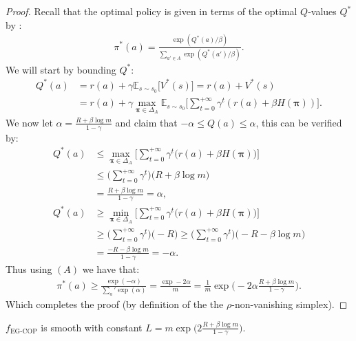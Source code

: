 \begin{proof}
    Recall that the optimal policy is given in terms of the optimal $Q$-values $Q^*$ by : 
    \begin{align*}
        \pi^*(a) = \frac{\exp(Q^*(a)/\beta)}{\sum_{a'\in A}\exp(Q^*(a')/\beta)}. \tag{A}
    \end{align*}
    We will start by bounding $Q^*$:
    \begin{align*}
        Q^*(a) &= r(a) + \gamma \mathbb{E}_{s \sim s_0} \Big[ V^*(s) \Big] = r(a) + V^*(s) \\
        & = r(a) + \gamma  \max_{\bm{\pi}\in \Delta_A} \mathbb{E}_{s \sim s_0} \Big[ \sum_{t=0}^{+\infty} \gamma^t (r(a)+\beta H(\bm{\pi})) \Big].
    \end{align*}
    We now let $\alpha = \frac{R + \beta \log m}{1-\gamma}$ and claim that $-\alpha \leq Q(a) \leq \alpha$, this can be verified by:
    \begin{align*}
        Q^*(a) &\leq \max_{\bm{\pi}\in \Delta_A} \Bigg[ \sum_{t=0}^{+\infty} \gamma^t \bigl( r(a) + \beta H(\bm{\pi}) \bigr) \Bigg]\\
        &\leq  \Big( \sum_{t=0}^{+\infty} \gamma^t \Big) \Big( R + \beta \log m \Big)\\
        &= \frac{R + \beta \log m}{1-\gamma} = \alpha,\\
        Q^*(a) &\geq \min_{\bm{\pi}\in \Delta_A} \Bigg[ \sum_{t=0}^{+\infty} \gamma^t \bigl( r(a) + \beta H(\bm{\pi}) \bigr) \Bigg]\\
        &\geq  \Big( \sum_{t=0}^{+\infty} \gamma^t \Big) \Big( -R \Big) \geq  \Big( \sum_{t=0}^{+\infty} \gamma^t \Big) \Big( -R - \beta \log m \Big)\\
        &= \frac{-R -\beta \log m}{1-\gamma} = -\alpha.
    \end{align*}
    Thus using $(A)$ we have that:
    \begin{align*}
        \pi^*(a) \geq \frac{\exp(-\alpha)}{\sum_a' \exp(\alpha)} 
        = \frac{\exp -2 \alpha}{m} = \frac{1}{m} \exp \Big( -2 \alpha \frac{R +\beta \log m}{1-\gamma}  \Big).
    \end{align*}
    Which completes the proof (by definition of the the $\rho$-non-vanishing simplex).
\end{proof}


\begin{proposition}
    \label{prop:f_eg_cop_smooth} $f_\text{EG-COP}$ is smooth with constant $L=m \exp \Big( 2 \frac{R +\beta \log m}{1-\gamma}  \Big)$.
\end{proposition}


